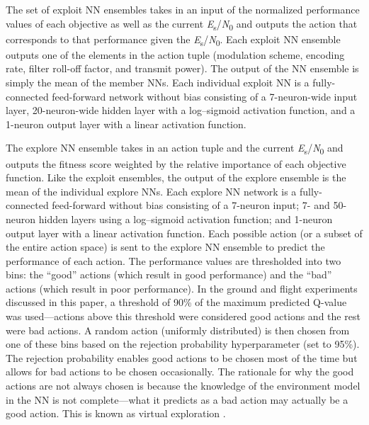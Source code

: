 \documentclass[journal]{IEEEtran}
\begin{document}
The set of exploit NN ensembles takes in an input of the normalized performance values of each objective as well as the current \textit{E}\textsubscript{s}/\textit{N}\textsubscript{0} and outputs the action that corresponds to that performance given the \textit{E}\textsubscript{s}/\textit{N}\textsubscript{0}.  Each exploit NN ensemble outputs one of the elements in the action tuple (modulation scheme, encoding rate, filter roll-off factor, and transmit power).  The output of the NN ensemble is simply the mean of the member NNs.  Each individual exploit NN is a fully-connected feed-forward network without bias consisting of a 7-neuron-wide input layer, 20-neuron-wide hidden layer with a log--sigmoid activation function, and a 1-neuron output layer with a linear activation function.

The explore NN ensemble takes in an action tuple and the current \textit{E}\textsubscript{s}/\textit{N}\textsubscript{0} and outputs the fitness score weighted by the relative importance of each objective function.  Like the exploit ensembles, the output of the explore ensemble is the mean of the individual explore NNs.  Each explore NN network is a fully-connected feed-forward without bias consisting of a 7-neuron input; 7- and 50-neuron hidden layers using a log--sigmoid activation function; and 1-neuron output layer with a linear activation function.  Each possible action (or a subset of the entire action space) is sent to the explore NN ensemble to predict the performance of each action.  The performance values are thresholded into two bins: the ``good'' actions (which result in good performance) and the ``bad'' actions (which result in poor performance).  In the ground and flight experiments discussed in this paper, a threshold of 90\% of the maximum predicted Q-value was used---actions above this threshold were considered good actions and the rest were bad actions.  A random action (uniformly distributed) is then chosen from one of these bins based on the rejection probability hyperparameter (set to 95\%).  The rejection probability enables good actions to be chosen most of the time but allows for bad actions to be chosen occasionally.  The rationale for why the good actions are not always chosen is because the knowledge of the environment model in the NN is not complete---what it predicts as a bad action may actually be a good action.  This is known as virtual exploration \cite{paulo-ccaa-paper,paulo-jrnl}.
\end{document}
